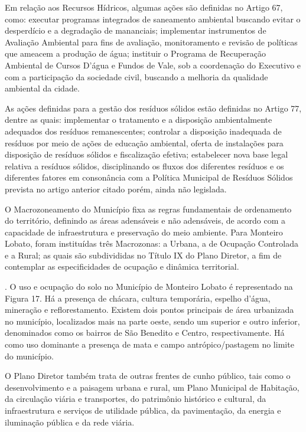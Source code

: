Em relação aos Recursos Hídricos, algumas ações são definidas no Artigo 67, como: executar programas integrados de saneamento ambiental buscando evitar o desperdício e a degradação de mananciais; implementar instrumentos de Avaliação Ambiental para fins de avaliação, monitoramento e revisão de políticas que ameacem a produção de água; instituir o Programa de Recuperação Ambiental de Cursos D’água e Fundos de Vale, sob a coordenação do Executivo e com a participação da sociedade civil, buscando a melhoria da qualidade ambiental da cidade.

As ações definidas para a gestão dos resíduos sólidos estão definidas no Artigo 77, dentre as quais: implementar o tratamento e a disposição ambientalmente adequados dos resíduos remanescentes; controlar a disposição inadequada de resíduos por meio de ações de educação ambiental, oferta de instalações para disposição de resíduos sólidos e fiscalização efetiva; estabelecer nova base legal relativa a resíduos sólidos, disciplinando os fluxos dos diferentes resíduos e os diferentes fatores em consonância com a Política Municipal de Resíduos Sólidos prevista no artigo anterior citado porém, ainda não  legislada.

O Macrozoneamento do Município fixa as regras fundamentais de ordenamento do território, definindo as áreas adensáveis e não adensáveis, de acordo com a capacidade de infraestrutura e preservação do meio ambiente. Para Monteiro Lobato, foram instituídas três Macrozonas: a Urbana, a de Ocupação Controlada e a Rural; as quais são subdivididas no Título IX do Plano Diretor, a fim de contemplar as especificidades de ocupação e dinâmica territorial.

. O uso e ocupação do solo no Município de Monteiro Lobato é representado na Figura 17. Há a presença de chácara, cultura temporária, espelho d’água, mineração e reflorestamento. Existem dois pontos principais de área urbanizada no município, localizados mais na parte oeste, sendo um superior e outro inferior, denominados como os bairros de São Benedito e Centro, respectivamente. Há como uso dominante a presença de mata e campo antrópico/pastagem no limite do município.

O Plano Diretor também trata de outras frentes de cunho público, tais como o desenvolvimento e a paisagem urbana e rural, um Plano Municipal de Habitação, da circulação viária e transportes, do patrimônio histórico e cultural, da infraestrutura e serviços de utilidade pública, da pavimentação, da energia e iluminação pública e da rede viária.

